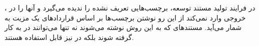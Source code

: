 ، در فرایند تولید مستند توسعه، برچسب‌هایی تعریف نشده را ندیده می‌گیرد و آنها را در خروجی وارد نمی‌کند از این
رو  نوشتن برچسب‌ها بر اساس قراردادهای  یک مزیت به شمار می‌آید. مستند‌های که به این روش نوشته می‌شوند نه
تنها می‌توانند در  به کار گرفته شوند بلکه در  نیز قابل استفاده هستند.